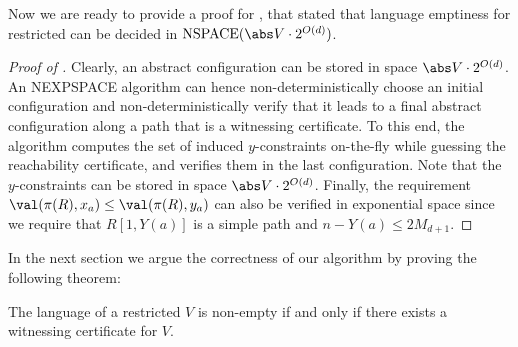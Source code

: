 Now we are ready to provide a proof for , that stated that language emptiness for restricted \laVASS can be decided in $\mathrm{NSPACE}( \abs V \cdot 2^{O(d)})$.
\begin{proof}[Proof of ]
  Clearly, an abstract configuration can be stored in space $\abs V \cdot 2^{O(d)}$. An NEXPSPACE algorithm can hence
  non-deterministically choose an initial configuration and
  non-deterministically verify that it leads to a final abstract
  configuration along a path that is a witnessing certificate. To this
  end, the algorithm computes the set of induced $y$-constraints
  on-the-fly while guessing the reachability certificate, and verifies
  them in the last configuration. Note that the $y$-constraints can be stored in space $\abs V \cdot 2^{O(d)}$. Finally, the requirement
  $\val(\pi(R),x_a) \le \val(\pi(R),y_a)$ can also be verified in
  exponential space since we require that $R[1,Y(a)]$ is a simple path and $n-Y(a)\le 2M_{d+1}$.
\end{proof}
%
In the next section we argue the correctness of our algorithm by proving the following theorem:
\begin{theorem}\label{theorem:certificate iff non-empty language}
The language of a restricted \laVASS $V$ is non-empty if and only if there exists a witnessing certificate for $V$.
\end{theorem}
%
